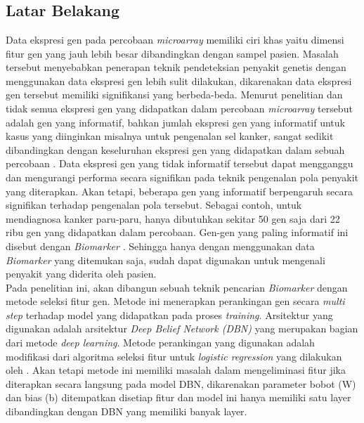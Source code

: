 \chapter{\babSatu}

\section{Latar Belakang}
Data ekspresi gen pada percobaan \textit{microarray} memiliki ciri khas yaitu dimensi fitur gen yang jauh lebih besar dibandingkan dengan sampel pasien. Masalah tersebut menyebabkan penerapan teknik pendeteksian penyakit genetis dengan menggunakan data ekspresi gen  lebih sulit dilakukan, dikarenakan data ekspresi gen tersebut memiliki signifikansi yang berbeda-beda. Menurut penelitian \cite{yoon2006building} dan \cite{bandyopadhyay2014survey} tidak semua ekspresi gen yang didapatkan dalam percobaan \textit{microarray} tersebut adalah gen yang informatif, bahkan jumlah ekspresi gen yang informatif untuk kasus yang diinginkan misalnya untuk pengenalan sel kanker, sangat sedikit dibandingkan dengan keseluruhan ekspresi gen yang didapatkan dalam sebuah percobaan \citep{bandyopadhyay2014survey}. Data ekspresi gen yang tidak informatif tersebut dapat mengganggu dan mengurangi performa secara signifikan pada teknik pengenalan pola penyakit yang diterapkan. Akan tetapi, beberapa gen yang informatif berpengaruh secara signifikan terhadap pengenalan pola tersebut. Sebagai contoh, untuk mendiagnosa kanker paru-paru, hanya dibutuhkan sekitar 50 gen saja dari 22 ribu gen yang didapatkan dalam percobaan. Gen-gen yang paling informatif ini disebut dengan \textit{Biomarker} \citep{belinsky2004gene}. Sehingga hanya dengan menggunakan data \textit{Biomarker} yang ditemukan saja, sudah dapat digunakan untuk mengenali penyakit yang diderita oleh pasien.\\

Pada penelitian ini, akan dibangun sebuah teknik pencarian \textit{Biomarker} dengan metode seleksi fitur gen. Metode ini menerapkan perankingan gen secara \textit{multi step} terhadap model yang didapatkan pada proses \textit{training}. Arsitektur yang digunakan adalah arsitektur \textit{Deep Belief Network (DBN)} yang merupakan bagian dari metode \textit{deep learning}. Metode perankingan yang digunakan adalah modifikasi dari algoritma seleksi fitur untuk \textit{logistic regression} yang dilakukan oleh \cite{shevade2003simple}. Akan tetapi metode ini memiliki masalah dalam  mengeliminasi fitur jika diterapkan secara langsung pada model DBN, dikarenakan parameter bobot (W) dan bias (b) ditempatkan disetiap fitur dan model ini hanya memiliki satu layer dibandingkan dengan DBN yang memiliki banyak layer. \\

